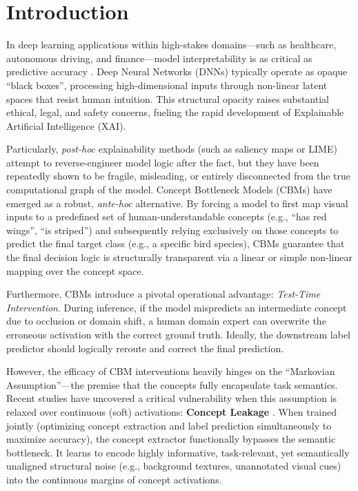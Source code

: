 \documentclass[times,twocolumn,final]{elsarticle}
\begin{document}

\section{Introduction}
\label{sec:intro}

In deep learning applications within high-stakes domains---such as healthcare, autonomous driving, and finance---model interpretability is as critical as predictive accuracy \citep{alvarez2018towards}. Deep Neural Networks (DNNs) typically operate as opaque ``black boxes'', processing high-dimensional inputs through non-linear latent spaces that resist human intuition. This structural opacity raises substantial ethical, legal, and safety concerns, fueling the rapid development of Explainable Artificial Intelligence (XAI).

Particularly, \textit{post-hoc} explainability methods (such as saliency maps or LIME) attempt to reverse-engineer model logic after the fact, but they have been repeatedly shown to be fragile, misleading, or entirely disconnected from the true computational graph of the model. Concept Bottleneck Models (CBMs) \citep{koh2020concept} have emerged as a robust, \textit{ante-hoc} alternative. By forcing a model to first map visual inputs to a predefined set of human-understandable concepts (e.g., ``has red wings'', ``is striped'') and subsequently relying exclusively on those concepts to predict the final target class (e.g., a specific bird species), CBMs guarantee that the final decision logic is structurally transparent via a linear or simple non-linear mapping over the concept space.

Furthermore, CBMs introduce a pivotal operational advantage: \textit{Test-Time Intervention}. During inference, if the model mispredicts an intermediate concept due to occlusion or domain shift, a human domain expert can overwrite the erroneous activation with the correct ground truth. Ideally, the downstream label predictor should logically reroute and correct the final prediction.

However, the efficacy of CBM interventions heavily hinges on the ``Markovian Assumption''---the premise that the concepts fully encapsulate task semantics. Recent studies have uncovered a critical vulnerability when this assumption is relaxed over continuous (soft) activations: \textbf{Concept Leakage} \citep{margeloi2021do, mahinpei2021promises, havasi2022addressing}. When trained jointly (optimizing concept extraction and label prediction simultaneously to maximize accuracy), the concept extractor functionally bypasses the semantic bottleneck. It learns to encode highly informative, task-relevant, yet semantically unaligned structural noise (e.g., background textures, unannotated visual cues) into the continuous margins of concept activations. 
\end{document}
